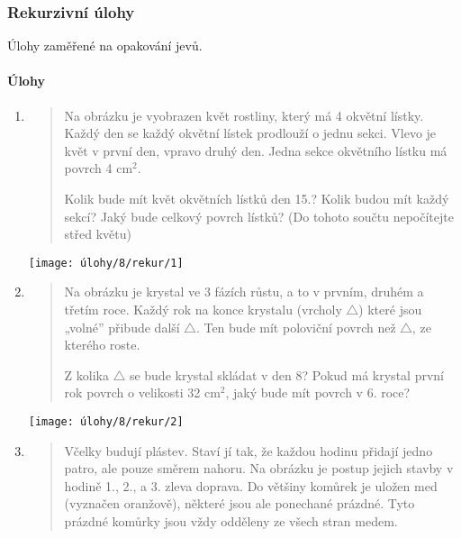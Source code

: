 \newpage

\subsubsection{Rekurzivní úlohy}
Úlohy zaměřené na opakování jevů.

\paragraph{Úlohy}
\begin{enumerate}
    \item
    \begin{minipage}[t]{\linewidth}
        \begin{quote}
            Na obrázku je vyobrazen květ rostliny, který má 4 okvětní lístky. Každý den se každý okvětní lístek prodlouží o jednu sekci. Vlevo je květ v první den, vpravo druhý den. Jedna sekce okvětního lístku má povrch 4 cm$^{2}$.

            Kolik bude mít květ okvětních lístků den 15.? Kolik budou mít každý sekcí? Jaký bude celkový povrch lístků? (Do tohoto součtu nepočítejte střed květu)
        \end{quote}
        \centering
        \texttt{[image: úlohy/8/rekur/1]}
    \end{minipage}

    \item
    \begin{minipage}[t]{\linewidth}
        \begin{quote}
            Na obrázku je krystal ve 3 fázích růstu, a to v prvním, druhém a třetím roce. Každý rok na konce krystalu (vrcholy $\triangle$) které jsou „volné” přibude další $\triangle$. Ten bude mít poloviční povrch než $\triangle$, ze kterého roste.

            Z kolika $\triangle$ se bude krystal skládat v den 8? Pokud má krystal první rok povrch o velikosti 32 cm$^{2}$, jaký bude mít povrch v 6. roce?
        \end{quote}
        \centering
        \texttt{[image: úlohy/8/rekur/2]}
    \end{minipage}

    \item
    \begin{minipage}[t]{\linewidth}
        \begin{quote}
            Včelky budují plástev. Staví jí tak, že každou hodinu přidají jedno patro, ale pouze směrem nahoru. Na obrázku je postup jejich stavby v hodině 1., 2., a 3. zleva doprava. Do většiny komůrek je uložen med (vyznačen oranžově), některé jsou ale ponechané prázdné. Tyto prázdné komůrky jsou vždy odděleny ze všech stran medem.


\end{quote}
\end{minipage}
\end{enumerate}
